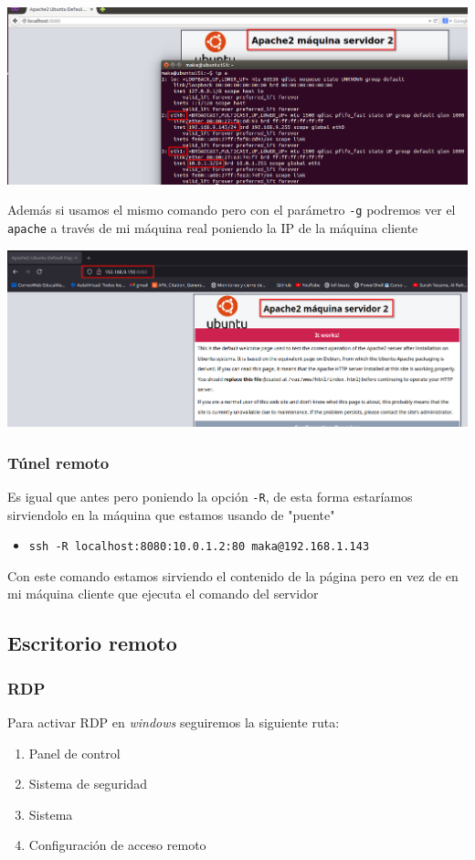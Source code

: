 \documentclass[11pt]{article}
\begin{document}
\begin{center}
\includegraphics[width=.9\linewidth]{./media/puertos-l.png}
\end{center}

Además si usamos el mismo comando pero con el parámetro \texttt{-g} podremos ver el \texttt{apache} a través de mi máquina real poniendo la IP de la máquina cliente

\begin{center}
\includegraphics[width=.9\linewidth]{./media/puertos-g.png}
\end{center}

\subsubsection{Túnel remoto}
\label{sec:orgac5e646}
Es igual que antes pero poniendo la opción \texttt{-R}, de esta forma estaríamos sirviendolo en la máquina que estamos usando de "puente"
\begin{itemize}
\item \texttt{ssh -R localhost:8080:10.0.1.2:80 maka@192.168.1.143}
\end{itemize}


Con este comando estamos sirviendo el contenido de la página pero en vez de en mi máquina cliente que ejecuta el comando del servidor
\subsection{Escritorio remoto}
\label{sec:orgc6d9146}
\subsubsection{RDP}
\label{sec:org9f867bc}
Para activar RDP en \emph{windows} seguiremos la siguiente ruta:
\begin{enumerate}
\item Panel de control
\item Sistema de seguridad
\item Sistema
\item Configuración de acceso remoto
\end{enumerate}
\end{document}
